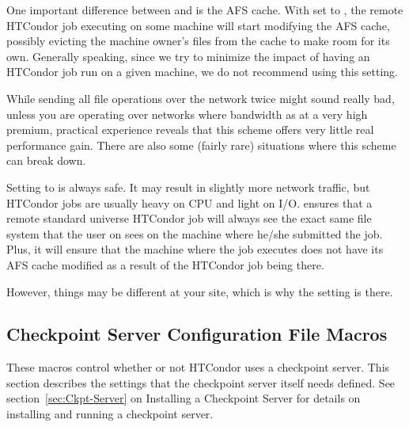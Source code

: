 \begin{description}
  One important difference between  and
   is the AFS cache.  With  set to
  , the remote HTCondor job executing on some machine will start
  modifying the AFS cache, possibly evicting the machine owner's
  files from the cache to make room for its own.  Generally speaking,
  since we try to minimize the impact of having an HTCondor job run on a
  given machine, we do not recommend using this setting.

  While sending all file operations over the network twice might sound
  really bad, unless you are operating over networks where bandwidth
  as at a very high premium, practical experience reveals that this
  scheme offers very little real performance gain.  There are also
  some (fairly rare) situations where this scheme can break down.
  
  Setting  to  is always safe.  It may result
  in slightly more network traffic, but HTCondor jobs are usually heavy
  on CPU and light on I/O.   ensures that a remote
  standard universe HTCondor job will always see the exact same
  file system that the user on sees on the machine where he/she
  submitted the job.  Plus, it will ensure that the machine where the
  job executes does not have its AFS cache modified as a result of
  the HTCondor job being there.  
  
  However, things may be different at your site, which is why the
  setting is there.

\end{description}

\subsection{\label{sec:Checkpoint-Server-Config-File-Entries}Checkpoint Server Configuration File Macros} 

These macros control whether or not HTCondor uses a checkpoint server.
This section
describes the settings that the checkpoint server itself needs defined. 
See section~\ref{sec:Ckpt-Server} on Installing a Checkpoint Server
for details on installing and running a checkpoint server.

